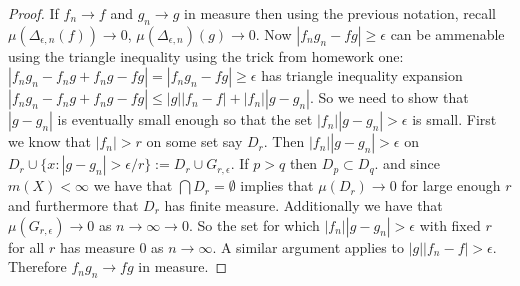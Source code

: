 \documentclass[11pt]{amsart}
\theoremstyle{definition}
\numberwithin{theorem}{section}
\numberwithin{definition}{section}
\numberwithin{equation}{section}
\begin{document}
\begin{proof}


	If $f_n \to f$ and $g_n \to g$ in measure then using the previous notation, recall $\mu(\Delta_{\epsilon, n}(f))\to 0$, $\mu(\Delta_{\epsilon, n})(g) \to 0$. Now $|f_ng_n -fg| \geq \epsilon$ can be ammenable using the triangle inequality using the trick from homework one: $|f_ng_n -f_ng + f_ng -fg| = |f_ng_n - fg| \geq \epsilon$ has triangle inequality expansion $|f_ng_n -f_ng + f_ng -fg| \leq |g||f_n -f| + |f_n||g- g_n|$. So we need to show that $|g-g_n|$ is eventually small enough so that the set $|f_n||g-g_n| > \epsilon$ is small. First we know that $|f_n| > r$ on some set say $D_r$. Then $|f_n||g-g_n| > \epsilon $ on $D_r \cup \{x : |g-g_n| > \epsilon/r\} := D_r \cup G_{r,\epsilon}.$ If $p > q$ then $D_p \subset D_q$. and since $m(X) < \infty$ we have that $\bigcap D_r = \emptyset$ implies that $\mu(D_r) \to 0$ for large enough $r$ and furthermore that $D_r$ has finite measure. Additionally we have that $\mu(G_{r, \epsilon}) \to 0 $ as $n \to \infty \to 0$. So the set for which $|f_n||g-g_n| > \epsilon$ with fixed $r$ for all $r$ has measure $0$ as $n \to \infty.$ A similar argument applies to $|g||f_n -f| > \epsilon$. Therefore $f_ng_n \to fg$ in measure.
\end{proof}
\end{document}
